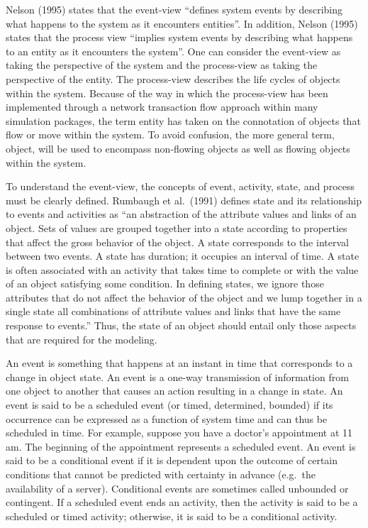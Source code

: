\documentclass[
]{book}
\theoremstyle{definition}
\theoremstyle{definition}
\theoremstyle{definition}
\theoremstyle{definition}
\theoremstyle{remark}
\begin{document}
Nelson (1995) states that the event-view ``defines system events by
describing what happens to the system as it encounters entities''. In
addition, Nelson (1995) states that the process view ``implies system
events by describing what happens to an entity as it encounters the
system''. One can consider the event-view as taking the perspective of
the system and the process-view as taking the perspective of the entity.
The process-view describes the life cycles of objects within the system.
Because of the way in which the process-view has been implemented
through a network transaction flow approach within many simulation
packages, the term entity has taken on the connotation of objects that
flow or move within the system. To avoid confusion, the more general
term, object, will be used to encompass non-flowing objects as well as
flowing objects within the system.

To understand the event-view, the concepts of event, activity, state,
and process must be clearly defined. Rumbaugh et al.~(1991) defines
state and its relationship to events and activities as ``an abstraction
of the attribute values and links of an object. Sets of values are
grouped together into a state according to properties that affect the
gross behavior of the object. A state corresponds to the interval
between two events. A state has duration; it occupies an interval of
time. A state is often associated with an activity that takes time to
complete or with the value of an object satisfying some condition. In
defining states, we ignore those attributes that do not affect the
behavior of the object and we lump together in a single state all
combinations of attribute values and links that have the same response
to events.'' Thus, the state of an object should entail only those
aspects that are required for the modeling.

An event is something that happens at an instant in time that
corresponds to a change in object state. An event is a one-way
transmission of information from one object to another that causes an
action resulting in a change in state. An event is said to be a
scheduled event (or timed, determined, bounded) if its occurrence can be
expressed as a function of system time and can thus be scheduled in
time. For example, suppose you have a doctor's appointment at 11 am. The
beginning of the appointment represents a scheduled event. An event is
said to be a conditional event if it is dependent upon the outcome of
certain conditions that cannot be predicted with certainty in advance
(e.g.~the availability of a server). Conditional events are sometimes
called unbounded or contingent. If a scheduled event ends an activity,
then the activity is said to be a scheduled or timed activity;
otherwise, it is said to be a conditional activity.
\end{document}
